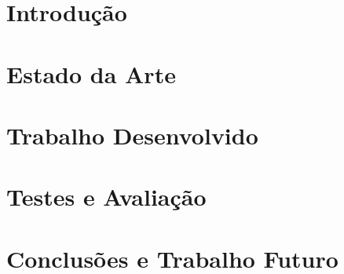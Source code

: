 \documentclass[a4paper, twoside, 12pt]{report}
\makeatletter
\renewcommand*{\cleardoublepage}{\clearpage\if@twoside \ifodd\c@page\else
\hbox{}%
\thispagestyle{empty}%
\newpage%
\if@twocolumn\hbox{}\newpage\fi\fi\fi}
\makeatother
\begin{document}
\chapter{Introdução}


\chapter{Estado da Arte}
\label{chap:state_of_the_art}


\clearpage \cleardoublepage %

\chapter{Trabalho Desenvolvido}\label{workcharp}


\chapter{Testes e Avaliação}\label{cap4}


\clearpage \cleardoublepage %


\chapter{Conclusões e Trabalho Futuro}



\clearpage \cleardoublepage %







\clearpage \cleardoublepage %
\end{document}
